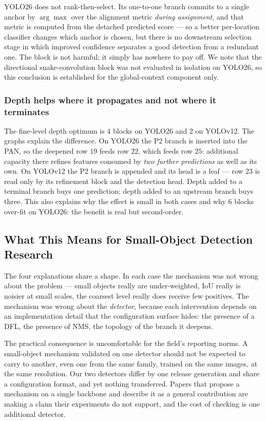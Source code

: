 \documentclass[10pt,twocolumn,a4paper]{article}
\begin{document}
YOLO26 does not rank-then-select. Its one-to-one branch commits to a single
anchor by $\arg\max$ over the alignment metric \emph{during assignment}, and
that metric is computed from the detached predicted score --- so a better
per-location classifier changes which anchor is chosen, but there is no
downstream selection stage in which improved confidence separates a good
detection from a redundant one. The block is not harmful; it simply has nowhere
to pay off. We note that the directional snake-convolution block was not
evaluated in isolation on YOLO26, so this conclusion is established for the
global-context component only.

\subsubsection{Depth helps where it propagates and not where it terminates}

The fine-level depth optimum is $4$ blocks on YOLO26 and $2$ on YOLOv12. The
graphs explain the difference. On YOLO26 the P2 branch is inserted into the PAN,
so the deepened row $19$ feeds row $22$, which feeds row $25$: additional
capacity there refines features consumed by \emph{two further predictions} as
well as its own. On YOLOv12 the P2 branch is appended and its head is a leaf ---
row $23$ is read only by its refinement block and the detection head. Depth
added to a terminal branch buys one prediction; depth added to an upstream
branch buys three. This also explains why the effect is small in both cases and
why $6$ blocks over-fit on YOLO26: the benefit is real but second-order.

\subsection{What This Means for Small-Object Detection Research}

The four explanations share a shape. In each case the mechanism was not wrong
about the problem --- small objects really are under-weighted, IoU really is
noisier at small scales, the coarsest level really does receive few positives.
The mechanism was wrong about the \emph{detector}, because each intervention
depends on an implementation detail that the configuration surface hides: the
presence of a DFL, the presence of NMS, the topology of the branch it deepens.

The practical consequence is uncomfortable for the field's reporting norms. A
small-object mechanism validated on one detector should not be expected to carry
to another, even one from the same family, trained on the same images, at the
same resolution. Our two detectors differ by one release generation and share a
configuration format, and yet nothing transferred. Papers that propose a
mechanism on a single backbone and describe it as a general contribution are
making a claim their experiments do not support, and the cost of checking is one
additional detector.
\end{document}
